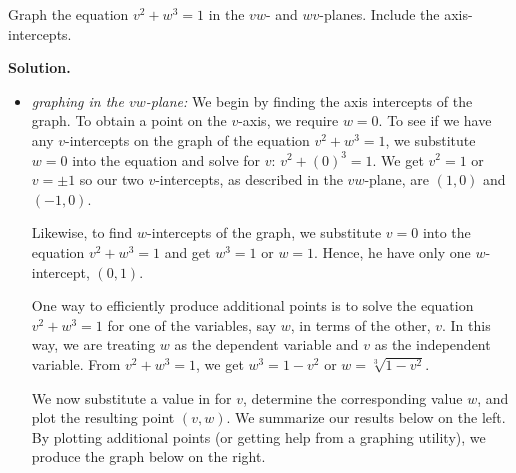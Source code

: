 \documentclass{ximera}
\begin{document}
\begin{example}   \label{firstequgraph} Graph the equation $v^2 + w^3 = 1$ in  the $vw$- and $wv$-planes.  Include the axis-intercepts. 


{\bf Solution.}  

\begin{itemize}

\item \textit{graphing in the $vw$-plane:}  We begin by finding the axis intercepts of the graph.  To obtain a point on the $v$-axis, we require $w = 0$.  To see if we have any $v$-intercepts on the graph of the equation $v^2+w^3 = 1$, we substitute $w=0$ into the equation and solve for $v$:  $v^2 + (0)^3 = 1$.  We get $v^2 = 1$ or $v = \pm 1$ so our two $v$-intercepts, as described in the $vw$-plane, are $(1,0)$ and $(-1,0)$. 

\smallskip

Likewise, to find $w$-intercepts of the graph, we substitute $v = 0$ into the equation $v^2+w^3 = 1$ and get $w^3 = 1$ or $w = 1$. Hence, he have only one $w$-intercept, $(0,1)$.  

\smallskip

One way to efficiently produce additional points is to solve the equation $v^2+w^3 = 1$ for one of the variables, say $w$, in terms of the other, $v$.  In this way, we are treating $w$ as the dependent variable and $v$ as the independent variable.  From  $v^2 + w^3 = 1$, we get $w^3 = 1 - v^2$ or $w = \sqrt[3]{1-v^2}$. 

\smallskip

We now substitute a value in for $v$, determine the corresponding value $w$, and plot the resulting point $(v,w)$.   We summarize our results below on the left.  By plotting additional points (or getting help from a graphing utility), we produce the graph below on the right.
 
 \begin{center}
\end{center}
\end{itemize}
\end{example}
\end{document}
